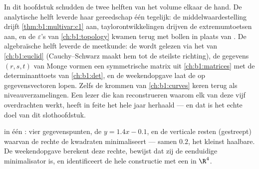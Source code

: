 \begin{remark}
\label{rem:b1:multivar:perspectives}
In dit hoofdstuk schudden de twee helften van het volume elkaar de
hand. De analytische helft leverde haar gereedschap één 
tegelijk: de middelwaardestelling drijft
\cref{thm:b1:multivar:c1} aan, taylorontwikkelingen drijven de
extremumtoetsen aan, en de $\varepsilon$'s van
\cref{ch:b1:topology} kwamen terug met bollen in plaats van
. De algebraïsche helft leverde de meetkunde: de
 wordt gelezen via het  van
\cref{ch:b1:euclid} (Cauchy--Schwarz maakt hem tot de steilste
richting), de gegevens $(r, s, t)$ van Monge vormen een
symmetrische matrix uit \cref{ch:b1:matrices} met de
determinanttoets van \cref{ch:b1:det}, en de weekendopgave laat de
 op gegevensvectoren lopen. Zelfs de krommen
van \cref{ch:b1:curves} keren terug als niveauverzamelingen. Een
lezer die kan reconstrueren waarom elk van deze vijf overdrachten
werkt, heeft in feite het hele jaar herhaald --- en dat is het
echte doel van dit slothoofdstuk.
\end{remark}

\begin{omfigure}

{\small {} in één : vier gegevenspunten, de
 $y = 1.4x - 0.1$, en de verticale resten
(gestreept) waarvan de rechte de kwadraten minimaliseert --- samen
$0.2$, het kleinst haalbare. De weekendopgave berekent deze rechte,
bewijst dat zij de eenduidige minimalisator is, en identificeert de
hele constructie met een  in $\R^4$.}
\end{omfigure}

